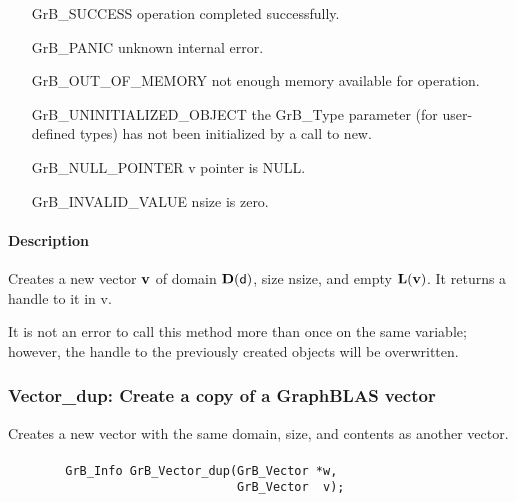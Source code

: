 \begin{itemize}[leftmargin=2.1in]
\item[{\sf GrB\_SUCCESS}]    operation completed successfully.
\item[{\sf GrB\_PANIC}]      unknown internal error.
\item[{\sf GrB\_OUT\_OF\_MEMORY}]   not enough memory available for operation.
\item[{\sf GrB\_UNINITIALIZED\_OBJECT}]   the {\sf GrB\_Type} parameter (for user-defined
                             types) has not been initialized by a
                             call to {\sf new}.
\item[{\sf GrB\_NULL\_POINTER}]    {\sf v} pointer is {\sf NULL}.
\item[{\sf GrB\_INVALID\_VALUE}]    {\sf nsize} is zero.
\end{itemize}

\paragraph{Description}

Creates a new vector ${\bf v}$ of domain $\bold{D}({\sf d})$, size {\sf nsize}, 
and empty $\bold{L}({\bf v})$. It returns a handle to it in {\sf v}.

It is not an error to call this method more than once on the same variable;  
however, the handle to the previously created objects will be overwritten. 

\subsubsection{{\sf Vector\_dup}: Create a copy of a GraphBLAS vector}

Creates a new vector with the same domain, size, and contents as another vector.

\paragraph{\syntax}

\begin{verbatim}
        GrB_Info GrB_Vector_dup(GrB_Vector *w,
                                GrB_Vector  v);
\end{verbatim}

